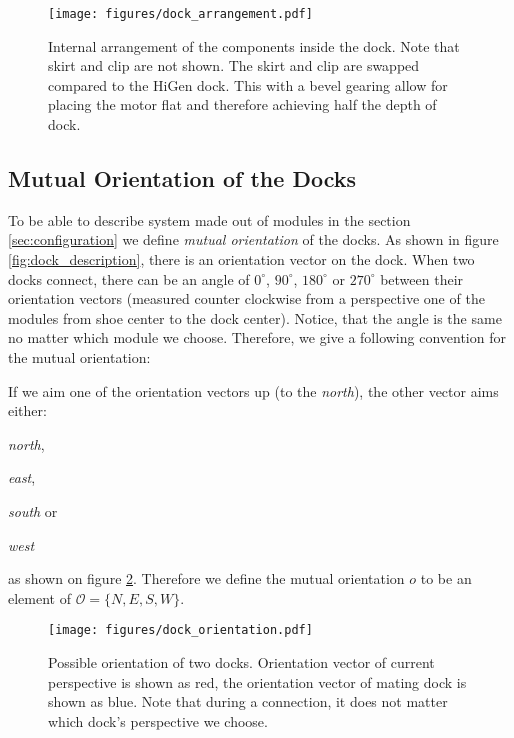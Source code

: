 \begin{figure}[!ht]
    \centering
    \texttt{[image: figures/dock\_arrangement.pdf]}
    \caption{Internal arrangement of the components inside the dock. Note that
    skirt and clip are not shown. The skirt and clip are swapped compared to the
    HiGen dock. This with a bevel gearing allow for placing the motor flat and
    therefore achieving half the depth of dock.}
    \label{fig:dock_internal_arrangement}
\end{figure}

\subsection{Mutual Orientation of the Docks}\label{sec:mutual_orientation}

To be able to describe system made out of modules in the section
\ref{sec:configuration} we define \emph{mutual orientation} of the docks. As
shown in figure \ref{fig:dock_description}, there is an orientation vector on
the dock. When two docks connect, there can be an angle of $0^\circ$,
$90^\circ$, $180^\circ$ or $270^\circ$ between their orientation vectors
(measured counter clockwise from a perspective one of the modules from shoe
center to the dock center). Notice, that the angle is the same no matter which
module we choose. Therefore, we give a following convention for the mutual
orientation:

If we aim one of the orientation vectors up (to the \emph{north}), the other
vector aims either:
\begin{enumerate*}
    \item \emph{north},
    \item \emph{east},
    \item \emph{south} or
    \item \emph{west}
\end{enumerate*}
as shown on figure \ref{fig:dock_orientation}. Therefore we define the mutual
orientation $o$ to be an element of $\mathcal{O} = \{N, E, S, W\}$.

\begin{figure}[!ht]
    \centering
    \texttt{[image: figures/dock\_orientation.pdf]}
    \caption{Possible orientation of two docks. Orientation vector of current
    perspective is shown as red, the orientation vector of mating dock is shown
    as blue. Note that during a connection, it does not matter which dock's
    perspective we choose.}
    \label{fig:dock_orientation}
\end{figure}


